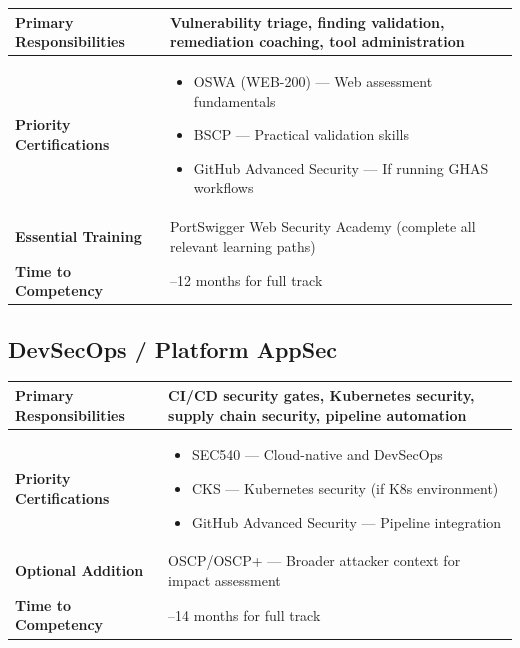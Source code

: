 \documentclass[11pt,letterpaper]{article}
\begin{document}
\begin{table}[H]
\centering
\begin{tabularx}{\textwidth}{l >{\raggedright\arraybackslash}X}
\toprule
\textbf{Primary Responsibilities} & Vulnerability triage, finding validation, remediation coaching, tool administration \\
\midrule
\textbf{Priority Certifications} & \begin{itemize}[nosep,leftmargin=*]
    \item OSWA (WEB-200) --- Web assessment fundamentals
    \item BSCP --- Practical validation skills
    \item GitHub Advanced Security --- If running GHAS workflows
\end{itemize} \\
\midrule
\textbf{Essential Training} & PortSwigger Web Security Academy (complete all relevant learning paths) \\
\midrule
\textbf{Time to Competency} & 8--12 months for full track \\
\bottomrule
\end{tabularx}
\end{table}

\subsection{DevSecOps / Platform AppSec}

\begin{table}[H]
\centering
\begin{tabularx}{\textwidth}{l >{\raggedright\arraybackslash}X}
\toprule
\textbf{Primary Responsibilities} & CI/CD security gates, Kubernetes security, supply chain security, pipeline automation \\
\midrule
\textbf{Priority Certifications} & \begin{itemize}[nosep,leftmargin=*]
    \item SEC540 --- Cloud-native and DevSecOps
    \item CKS --- Kubernetes security (if K8s environment)
    \item GitHub Advanced Security --- Pipeline integration
\end{itemize} \\
\midrule
\textbf{Optional Addition} & OSCP/\allowbreak{}OSCP+ --- Broader attacker context for impact assessment \\
\midrule
\textbf{Time to Competency} & 10--14 months for full track \\
\bottomrule
\end{tabularx}
\end{table}
\end{document}
